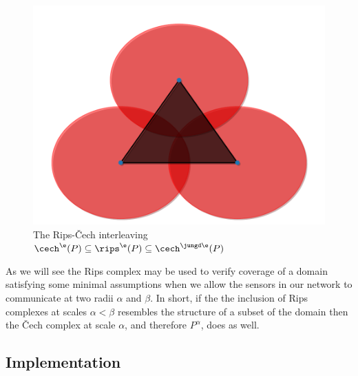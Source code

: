 \begin{figure}[htbp]
     \includegraphics[scale=0.23]{figures/include3.pdf}
     \caption{The Rips-\v Cech interleaving $\cech^\e(P) \subseteq \rips^\e(P) \subseteq \cech^{\jungd \e}(P)$ }
     \label{fig:incluson}
 \end{figure}

As we will see the Rips complex may be used to verify coverage of a domain satisfying some minimal assumptions when we allow the sensors in our network to communicate at two radii $\alpha$ and $\beta$.
In short, if the the inclusion of Rips complexes at scales $\alpha < \beta$ resembles the structure of a subset of the domain then the \v Cech complex at scale $\alpha$, and therefore $P^\alpha$, does as well.

\subsection{Implementation}

